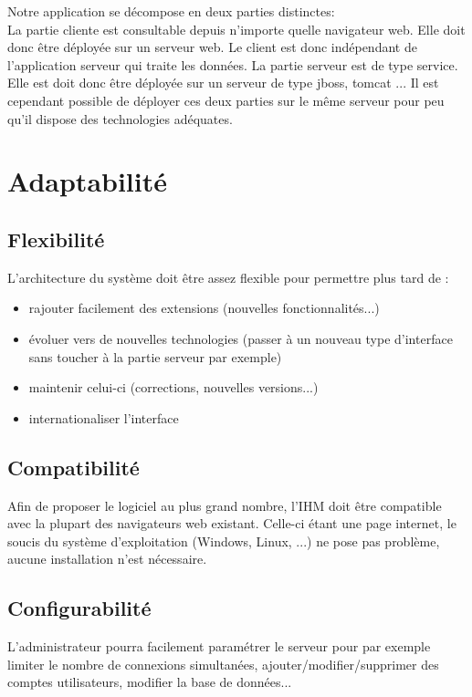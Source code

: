 Notre application se décompose en deux parties distinctes: \\
La partie cliente est consultable depuis n'importe quelle navigateur web. Elle doit donc être déployée sur un serveur web. Le client est donc indépendant de l'application serveur qui traite les données.
La partie serveur est de type service. Elle est doit donc être déployée sur un serveur de type jboss, tomcat ... 
Il est cependant possible de déployer ces deux parties sur le même serveur pour peu qu'il dispose des technologies adéquates.


\section{Adaptabilité}

	\subsection{Flexibilité}

L'architecture du système doit être assez flexible pour permettre plus tard de :

\begin{itemize}
\item  rajouter facilement des extensions (nouvelles fonctionnalités...)
\item  évoluer vers de nouvelles technologies (passer à un nouveau type d'interface sans toucher à la partie serveur par exemple)
\item  maintenir celui-ci (corrections, nouvelles versions...)
\item  internationaliser l'interface\\
\end{itemize}

	\subsection{Compatibilité}

    Afin de proposer le logiciel au plus grand nombre, l'IHM doit être compatible avec la plupart des navigateurs web existant. Celle-ci étant une page internet, le soucis du système d'exploitation (Windows, Linux, ...) ne pose pas problème, aucune installation n'est nécessaire.

	\subsection{Configurabilité}

L'administrateur pourra facilement paramétrer le serveur pour par exemple limiter le nombre de connexions simultanées, ajouter/modifier/supprimer des comptes utilisateurs, modifier la base de données...







